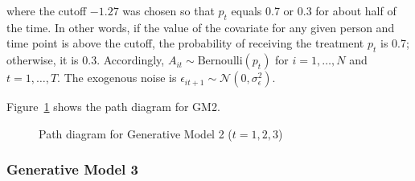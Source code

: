 \documentclass[
  12pt,
  a4paper,
]{article}
\begin{document}
where the cutoff \(-1.27\) was chosen so that \(p_t\) equals 0.7 or 0.3
for about half of the time. In other words, if the value of the
covariate for any given person and time point is above the cutoff, the
probability of receiving the treatment \(p_t\) is 0.7; otherwise, it is
0.3. Accordingly, \(A_{it} \sim \text{Bernoulli}(p_t)\) for
\(i = 1, \ldots, N\) and \(t = 1, \ldots, T\). The exogenous noise is
\(\epsilon_{it+1} \sim \mathcal{N}(0, \sigma_\epsilon^2)\).

Figure~\ref{fig-GM2_path} shows the path diagram for GM2.

\begin{figure}[H]

\caption{\label{fig-GM2_path}Path diagram for Generative Model 2
(\(t = 1, 2, 3\))}


\end{figure}%

\subsubsection{Generative Model 3}\label{generative-model-3}
\end{document}
